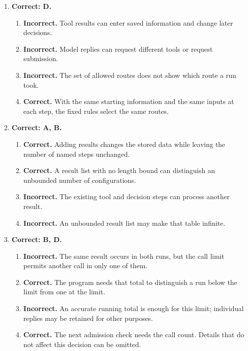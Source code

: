 \begin{enumerate}[start=1,itemsep=0.7\baselineskip]
\item[{\hyperref[exercise:3]{3.}}] \begin{minipage}[t]{\linewidth}
\textbf{Correct: D.}
\begin{enumerate}[label=\textnormal{(\Alph*)},leftmargin=*,itemsep=0pt]
\item \textbf{Incorrect.} Tool results can enter saved information and change later decisions.
\item \textbf{Incorrect.} Model replies can request different tools or request submission.
\item \textbf{Incorrect.} The set of allowed routes does not show which route a run took.
\item \textbf{Correct.} With the same starting information and the same inputs at each step, the fixed rules select the same routes.
\end{enumerate}
\end{minipage}

\item[{\hyperref[exercise:4]{4.}}] \begin{minipage}[t]{\linewidth}
\textbf{Correct: A, B.}
\begin{enumerate}[label=\textnormal{(\Alph*)},leftmargin=*,itemsep=0pt]
\item \textbf{Correct.} Adding results changes the stored data while leaving the number of named steps unchanged.
\item \textbf{Correct.} A result list with no length bound can distinguish an unbounded number of configurations.
\item \textbf{Incorrect.} The existing tool and decision steps can process another result.
\item \textbf{Incorrect.} An unbounded result list may make that table infinite.
\end{enumerate}
\end{minipage}

\item[{\hyperref[exercise:5]{5.}}] \begin{minipage}[t]{\linewidth}
\textbf{Correct: B, D.}
\begin{enumerate}[label=\textnormal{(\Alph*)},leftmargin=*,itemsep=0pt]
\item \textbf{Incorrect.} The same result occurs in both runs, but the call limit permits another call in only one of them.
\item \textbf{Correct.} The program needs that total to distinguish a run below the limit from one at the limit.
\item \textbf{Incorrect.} An accurate running total is enough for this limit; individual replies may be retained for other purposes.
\item \textbf{Correct.} The next admission check needs the call count. Details that do not affect this decision can be omitted.
\end{enumerate}
\end{minipage}


\end{enumerate}
